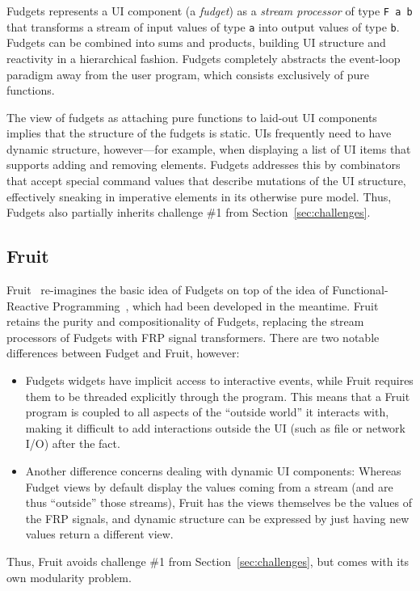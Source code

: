 \documentclass[sigplan,screen]{acmart}
\begin{document}
Fudgets represents a UI component (a \textit{fudget}) as a
\textit{stream processor} of type \verb|F a b| that transforms a
stream of input values of type \texttt{a} into output values of type
\texttt{b}.  Fudgets can be combined into sums and products, building
UI structure and reactivity in a hierarchical fashion.  Fudgets
completely abstracts the event-loop paradigm away from the user
program, which consists exclusively of pure functions.

The view of fudgets as attaching pure functions to laid-out UI
components implies that the structure of the fudgets is static.  UIs
frequently need to have dynamic structure, however---for example, when
displaying a list of UI items that supports adding and removing
elements.  Fudgets addresses this by combinators that accept special
command values that describe mutations of the UI structure,
effectively sneaking in imperative elements in its otherwise pure
model.  Thus, Fudgets also partially inherits challenge \#1 from
Section~\ref{sec:challenges}.

\subsection{Fruit}

Fruit~\cite{Fruit} re-imagines the basic idea of Fudgets on top of the
idea of Functional-Reactive Programming~\cite{FRP}, which had been
developed in the meantime.  Fruit retains the purity and
compositionality of Fudgets,  replacing the stream processors of
Fudgets with FRP signal transformers.  There are two notable
differences between Fudget and Fruit, however:
\begin{itemize}
\item Fudgets widgets have implicit access to interactive events,
  while Fruit requires them to be threaded explicitly through the
  program.  This means that a Fruit program is coupled to all aspects
  of the ``outside world'' it interacts with, making it difficult to
  add interactions outside the UI (such as file or network I/O) after
  the fact.
\item Another difference concerns dealing with dynamic UI components:
  Whereas Fudget views by default display the values coming from a
  stream (and are thus ``outside'' those streams), Fruit has the views
  themselves be the values of the FRP signals, and dynamic structure
  can be expressed by just having new values return a different view.
\end{itemize}
%
Thus, Fruit avoids challenge \#1 from Section~\ref{sec:challenges},
but comes with its own modularity problem.
\end{document}
